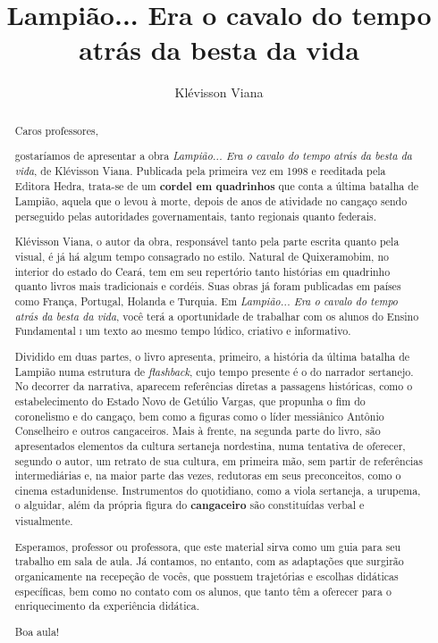 \documentclass[11pt]{extarticle}
\newcommand{\AutorLivro}{Klévisson Viana}
\newcommand{\TituloLivro}{Lampião... Era o cavalo do tempo atrás da besta da vida}
\newcommand{\colaborador}{Renier Silva}
\begin{document}
\title{\TituloLivro}
\author{\AutorLivro}
\def\authornotes{\colaborador}

\date{}
\maketitle

\tableofcontents


\begin{abstract}

Caros professores, 

gostaríamos de apresentar a obra \textit{Lampião... Era o cavalo do tempo atrás da besta da vida},
de Klévisson Viana. Publicada pela primeira vez em 1998 e reeditada pela Editora Hedra, 
trata-se de um \textbf{cordel em quadrinhos} que conta a última batalha de Lampião, aquela que 
o levou à morte, depois de anos de atividade no cangaço sendo perseguido pelas autoridades governamentais,
tanto regionais quanto federais. 

Klévisson Viana, o autor da obra, responsável tanto pela parte escrita quanto pela visual, 
é já há algum tempo consagrado no estilo. Natural de Quixeramobim, no interior do estado do Ceará,
tem em seu repertório tanto histórias em quadrinho quanto livros mais tradicionais e cordéis. 
Suas obras já foram publicadas em países como França, Portugal, Holanda e Turquia. 
Em \textit{Lampião... Era o cavalo do tempo atrás da besta da vida}, você terá a oportunidade de trabalhar com 
os alunos do Ensino Fundamental \textsc{i} um texto ao mesmo tempo lúdico, criativo e informativo. 

Dividido em duas partes, o livro apresenta, primeiro, a história da última batalha de Lampião
numa estrutura de \textit{flashback}, cujo tempo presente é o do narrador sertanejo. 
No decorrer da narrativa, aparecem referências diretas a passagens históricas, como o estabelecimento 
do Estado Novo de Getúlio Vargas, que propunha o fim do coronelismo e do cangaço,
bem como a figuras como o líder messiânico Antônio Conselheiro e outros cangaceiros. 
Mais à frente, na segunda parte do livro, são apresentados elementos da cultura sertaneja nordestina, numa tentativa de oferecer,
segundo o autor, um retrato de sua cultura, em primeira mão, 
sem partir de referências intermediárias e, na maior parte das vezes, redutoras
em seus preconceitos, como o cinema estadunidense. Instrumentos do quotidiano, como a viola sertaneja,
a urupema, o alguidar, além da própria figura do \textbf{cangaceiro} são constituídas verbal e visualmente. 

Esperamos, professor ou professora, que este material sirva como um guia 
para seu trabalho em sala de aula. Já contamos, no entanto, com as adaptações
que surgirão organicamente na recepeção de vocês, que possuem 
trajetórias e escolhas didáticas específicas, bem como no contato com os 
alunos, que tanto têm a oferecer para o enriquecimento da experiência didática.

Boa aula!

\end{abstract}
\end{document}
